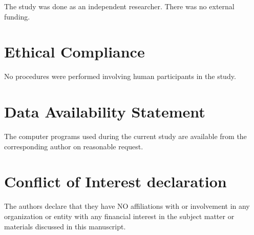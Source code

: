 \documentclass[twoside]{article}
\begin{document}
 The study was done as an independent researcher. There was no
external funding.

\section*{Ethical Compliance}

 No procedures were performed  involving human participants in the study.

\section*{Data Availability Statement}

The computer programs used during the current study are
available from the corresponding author on reasonable request.

\section*{Conflict of Interest declaration} 

The authors declare that they have NO affiliations with or involvement in any organization 
or entity with any financial interest in the subject matter or materials discussed 
in this manuscript.
\end{document}
